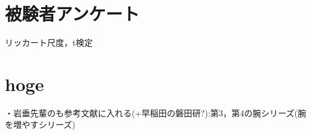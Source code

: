         
       
        
    \section{被験者アンケート}
    リッカート尺度，t検定
    
    

\section{hoge}        
        ・岩垂先輩のも参考文献に入れる(+早稲田の磐田研?):第3，第4の腕シリーズ(腕を増やすシリーズ) 

